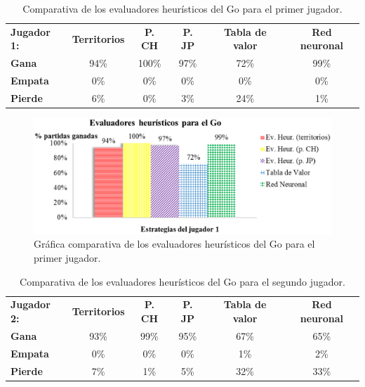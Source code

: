 \begin{table}[!h]
\centering
\caption[Comparativa de los evaluadores heurísticos del Go (I)]{Comparativa de los evaluadores heurísticos del Go para el primer jugador.}
\label{tab:comparativa_heuristicos_go_jug1}
\begin{tabular}{lccccc}
\hline
\textbf{Jugador 1:} & \textbf{Territorios} & \textbf{P. CH} & \textbf{P. JP} & \textbf{Tabla de valor} & \textbf{Red neuronal} \\
\textbf{Gana} & 94\% & 100\% & 97\% & 72\% & 99\% \\
\textbf{Empata} & 0\% & 0\% & 0\% & 0\% & 0\% \\
\textbf{Pierde} & 6\% & 0\% & 3\% & 24\% & 1\% \\
\hline
\end{tabular}
\end{table} 

\begin{figure}[!h]
	\centering
	\includegraphics[scale=0.3]{contenido/cap7/imagenes/heuristicosGojug1.eps}
	\caption[Comparativa de los evaluadores heurísticos del Go (I)]{Gráfica comparativa de los evaluadores heurísticos del Go para el primer jugador.}
	\label{fig:comparativa_heuristicos_go_jug1}
\end{figure}

\begin{table}[b]
\centering
\caption[Comparativa de los evaluadores heurísticos del Go (II)]{Comparativa de los evaluadores heurísticos del Go para el segundo jugador.}
\label{tab:comparativa_heuristicos_go_jug2}
\begin{tabular}{lccccc}
\hline
\textbf{Jugador 2:} & \textbf{Territorios} & \textbf{P. CH} & \textbf{P. JP} & \textbf{Tabla de valor} & \textbf{Red neuronal} \\
\textbf{Gana} & 93\% & 99\% & 95\% & 67\% & 65\% \\
\textbf{Empata} & 0\% & 0\% & 0\% & 1\% & 2\% \\
\textbf{Pierde} & 7\% & 1\% & 5\% & 32\% & 33\% \\
\hline
\end{tabular}
\end{table} 

